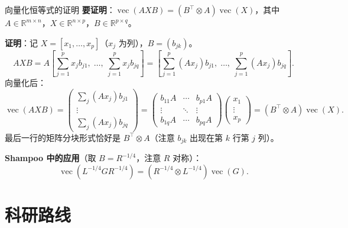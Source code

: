 \documentclass[aspectratio=169,10pt]{ctexbeamer}
\newcommand{\R}{\mathbb{R}}
\newcommand{\vect}{\operatorname{vec}}
\begin{document}
\begin{frame}{向量化恒等式的证明}
\textbf{要证明}：$\vect(AXB)=(B^\top\otimes A)\vect(X)$，其中 $A\in\R^{m\times n}$，$X\in\R^{n\times p}$，$B\in\R^{p\times q}$。

\vspace{.15cm}
\textbf{证明}：记 $X=[x_1,\ldots,x_p]$（$x_j$ 为列），$B=(b_{jk})$。
\[
  AXB=A\left[\sum_{j=1}^p x_j b_{j1},\;\ldots,\;\sum_{j=1}^p x_j b_{jq}\right]
     =\left[\sum_{j=1}^p (Ax_j)b_{j1},\;\ldots,\;\sum_{j=1}^p (Ax_j)b_{jq}\right].
\]
向量化后：
\[
  \vect(AXB)=\begin{pmatrix}
  \sum_j (Ax_j)b_{j1}\\
  \vdots\\
  \sum_j (Ax_j)b_{jq}
  \end{pmatrix}
  =\begin{pmatrix}
  b_{11}A & \cdots & b_{p1}A\\
  \vdots & \ddots & \vdots\\
  b_{1q}A & \cdots & b_{pq}A
  \end{pmatrix}
  \begin{pmatrix}x_1\\\vdots\\x_p\end{pmatrix}
  =(B^\top\otimes A)\vect(X).
\]
最后一行的矩阵分块形式恰好是 $B^\top\otimes A$（注意 $b_{jk}$ 出现在第 $k$ 行第 $j$ 列）。

\vspace{.15cm}
\textbf{Shampoo 中的应用}（取 $B=R^{-1/4}$，注意 $R$ 对称）：
\[
  \vect(L^{-1/4}GR^{-1/4})=(R^{-1/4}\otimes L^{-1/4})\vect(G).
\]
\end{frame}

\section{科研路线}
\end{document}
